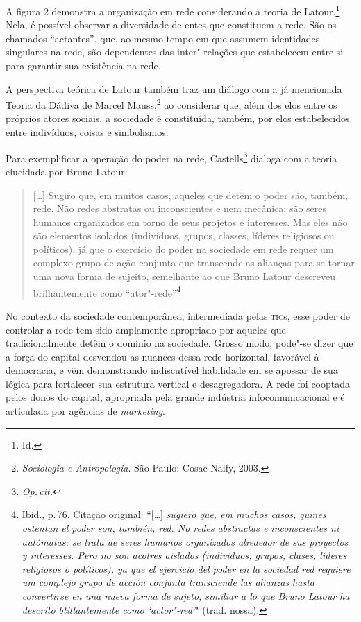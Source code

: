 A figura 2 demonstra a organização em rede considerando a teoria de
Latour.\footnote{Id.} Nela, é possível observar a diversidade de entes que
constituem a rede. São os chamados ``actantes'', que, ao mesmo tempo em
que assumem identidades singulares na rede, são dependentes das
inter"-relações que estabelecem entre si para garantir sua existência na
rede.

A perspectiva teórica de Latour também traz um diálogo com a já
mencionada Teoria da Dádiva de Marcel Mauss,\footnote{\emph{Sociologia e Antropologia}. São Paulo: Cosac Naify, 2003.} ao considerar que,
além dos elos entre os próprios atores sociais, a sociedade é
constituída, também, por elos estabelecidos entre indivíduos, coisas e
simbolismos.

Para exemplificar a operação do poder na rede, Castells\footnote{\textit{Op.\,cit.}} dialoga
com a teoria elucidada por Bruno Latour:

\begin{quote}
{[}\ldots{}{]} Sugiro que, em muitos casos, aqueles que detêm o poder são,
também, rede. Não redes abstratas ou inconscientes e nem mecânica: são
seres humanos organizados em torno de seus projetos e interesses. Mas
eles não são elementos isolados (indivíduos, grupos, classes, líderes
religiosos ou políticos), já que o exercício do poder na sociedade em
rede requer um complexo grupo de ação conjunta que transcende as
alianças para se tornar uma nova forma de sujeito, semelhante ao que
Bruno Latour descreveu brilhantemente como ``ator"-rede''\footnote{Ibid., p.\,76. Citação
  original: ``{[}\ldots{}{]} \emph{sugiero que, em muchos casos, quines ostentan el
        poder son, también, red. No redes abstractas e inconscientes ni
        autómatas: se trata de seres humanos organizados alrededor de sus
        proyectos y interesses. Pero no son acotres aislados (individuos,
        grupos, clases, líderes religiosos o políticos), ya que el ejercicio
        del poder en la sociedad red requiere um complejo grupo de acción
        conjunta transciende las alianzas hasta convertirse en una nueva forma
        de sujeto, similiar a lo que Bruno Latour ha descrito btillantemente
        como `actor"-red'}" (trad. nossa).}
\end{quote}

No contexto da sociedade contemporânea, intermediada pelas \textsc{tic}s, esse
poder de controlar a rede tem sido amplamente apropriado por aqueles que
tradicionalmente detêm o domínio na sociedade. Grosso modo, pode"-se
dizer que a força do capital desvendou as nuances dessa rede horizontal,
favorável à democracia, e vêm demonstrando indiscutível habilidade em se
apossar de sua lógica para fortalecer sua estrutura vertical e
desagregadora. A rede foi cooptada pelos donos do capital, apropriada
pela grande indústria infocomunicacional e é articulada por agências de
\emph{marketing}.

